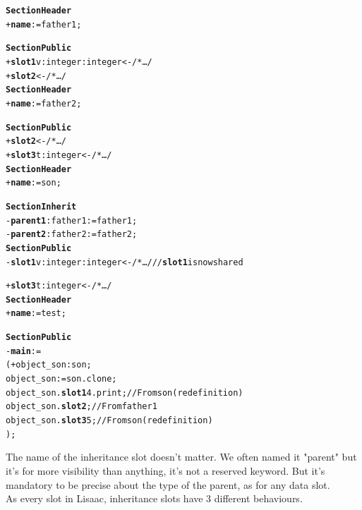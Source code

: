 \documentclass[11pt]{mybook}
\begin{document}
\begin{alltt}
{\bf{}Section Header}
  + {\bf{}name}     := {\sc{}father1};          

{\bf{}Section Public}
  + {\bf{}slot1} v:{\sc{}integer} :{\sc{}integer} <- /* \ldots */
  + {\bf{}slot2} <- /* \ldots */\\

{\bf{}Section Header}
  + {\bf{}name}     := {\sc{}father2};          

{\bf{}Section Public}
  + {\bf{}slot2} <- /* \ldots */
  + {\bf{}slot3} t:{\sc{}integer} <- /* \ldots */\\

{\bf{}Section Header}
  + {\bf{}name}     := {\sc{}son};          

{\bf{}Section Inherit}
  - {\bf{}parent1}:{\sc{}father1} := {\sc{}father1};
  - {\bf{}parent2}:{\sc{}father2} := {\sc{}father2};
{\bf{}Section Public}
  - {\bf{}slot1} v:{\sc{}integer} :{\sc{}integer} <- /* \ldots */  // {\bf{}slot1} is now shared

  + {\bf{}slot3} t:{\sc{}integer} <- /* \ldots */\\

{\bf{}Section Header}
  + {\bf{}name}     := {\sc{}test};          

{\bf{}Section Public}
  - {\bf{}main} :=
  ( + object_son:{\sc{}son};
    object_son := {\sc{}son}.clone;
    object_son.{\bf{}slot1} 4.print;    // From {\sc{}son}  (redefinition)
    object_son.{\bf{}slot2};            // From {\sc{}father1}
    object_son.{\bf{}slot3} 5;          // From {\sc{}son}  (redefinition)
  );
\end{alltt}

The name of the inheritance slot doesn't matter. We often named it "parent" but it's for more visibility than anything, it's not a reserved keyword.
But it's mandatory to be precise about the type of the parent, as for any data slot.\\

As every slot in Lisaac, inheritance slots have 3 different behaviours.\\
\end{document}
